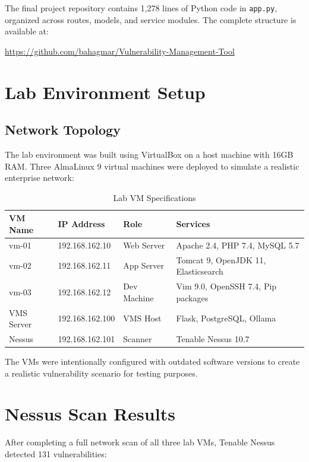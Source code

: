 The final project repository contains 1,278 lines of Python code in \texttt{app.py}, organized across routes, models, and service modules. The complete structure is available at:
\begin{center}
\url{https://github.com/bahagmar/Vulnerability-Management-Tool}
\end{center}

\section{Lab Environment Setup}

\subsection{Network Topology}

The lab environment was built using VirtualBox on a host machine with 16GB RAM. Three AlmaLinux 9 virtual machines were deployed to simulate a realistic enterprise network:

\begin{table}[H]
\centering
\caption{Lab VM Specifications}
\label{tab:labvms}
\begin{tabular}{llll}
\toprule
\textbf{VM Name} & \textbf{IP Address} & \textbf{Role} & \textbf{Services} \\
\midrule
vm-01 & 192.168.162.10 & Web Server & Apache 2.4, PHP 7.4, MySQL 5.7 \\
vm-02 & 192.168.162.11 & App Server & Tomcat 9, OpenJDK 11, Elasticsearch \\
vm-03 & 192.168.162.12 & Dev Machine & Vim 9.0, OpenSSH 7.4, Pip packages \\
\midrule
VMS Server & 192.168.162.100 & VMS Host & Flask, PostgreSQL, Ollama \\
Nessus & 192.168.162.101 & Scanner & Tenable Nessus 10.7 \\
\bottomrule
\end{tabular}
\end{table}

The VMs were intentionally configured with outdated software versions to create a realistic vulnerability scenario for testing purposes.

\section{Nessus Scan Results}

After completing a full network scan of all three lab VMs, Tenable Nessus detected 131 vulnerabilities:

